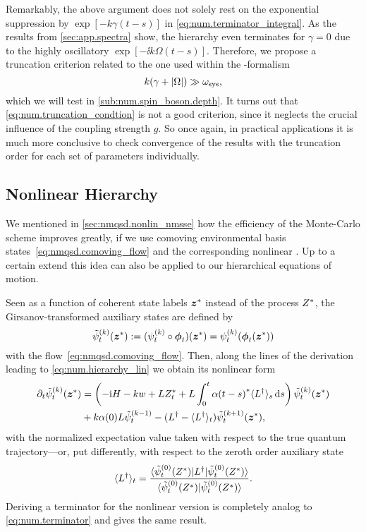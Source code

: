 Remarkably, the above argument does not solely rest on the exponential suppression by $\exp[-k\gamma(t-s)]$ in \autoref{eq:num.terminator_integral}.
As the results from \autoref{sec:app.spectra} show, the hierarchy even terminates for $\gamma = 0$ due to the highly oscillatory $\exp[-\ii k \Omega(t-s)]$.
Therefore, we propose a truncation criterion related to the one used within the \HEOM-formalism \cite{Ta06_stochastic}
\begin{equation}
  k(\gamma + \vert \Omega \vert) \gg \omega_\mathrm{sys},
  \label{eq:num.truncation_condtion}
\end{equation}
which we will test in \autoref{sub:num.spin_boson.depth}.
It turns out that \autoref{eq:num.truncation_condtion} is not a good criterion, since it neglects the crucial influence of the coupling strength $g$.
So once again, in practical applications it is much more conclusive to check convergence of the results with the truncation order for each set of parameters individually.

\subsection{Nonlinear Hierarchy}
\label{sub:num.sheom.nonlin}

We mentioned in \autoref{sec:nmqsd.nonlin_nmsse} how the efficiency of the Monte-Carlo scheme improves greatly, if we use comoving environmental basis states~\ref{eq:nmqsd.comoving_flow} and the corresponding nonlinear {\NMSSE}.
Up to a certain extend this idea can also be applied to our hierarchical equations of motion.

Seen as a function of coherent state labels ${\boldsymbol{z}}^*$ instead of the process ${Z}^*$, the Girsanov-transformed auxiliary states are defined by
\begin{equation*}
  \tilde\psi_t^{(k)}(\cc\zz) := (\psit[k] \circ \vec\phi_t)(\cc\zz) = \psit[k](\vec\phi_t(\cc\zz))
\end{equation*}
with the  flow~\ref{eq:nmqsd.comoving_flow}.
Then, along the lines of the derivation leading to \autoref{eq:num.hierarchy_lin} we obtain its nonlinear form
\begin{align}
  \partial_t \tilde\psi_t^{(k)}({\boldsymbol{z}}^*) &= \left( -\mathrm{i}H - kw + L{Z}^*_t + L \int_0^t {\alpha(t-s)}^* \langle L^\dagger \rangle_s \, \mathrm{d} s \right)\tilde\psi_t^{(k)}({\boldsymbol{z}}^*) \nonumber\\
  &+ k \alpha(0) L \tilde\psi_t^{(k-1)} - (L^\dagger - \langle L^\dagger \rangle_t) \tilde\psi_t^{(k+1)}({\boldsymbol{z}}^*),
  \label{eq:num.hierarchy_nonlin}
\end{align}
with the normalized expectation value taken with respect to the true quantum trajectory---or, put differently, with respect to the zeroth order auxiliary state
\begin{equation}
  \langle L^\dagger \rangle_t = \frac{\langle \tilde\psi_t^{(0)}({Z}^*) | L^\dagger | \tilde\psi_t^{(0)}({Z}^*) \rangle}{\langle \tilde\psi_t^{(0)}({Z}^*) | \tilde\psi_t^{(0)}({Z}^*) \rangle}.
  \label{eq:num.qmean}
\end{equation}
Deriving a terminator for the nonlinear version is completely analog to \autoref{eq:num.terminator} and gives the same result.

